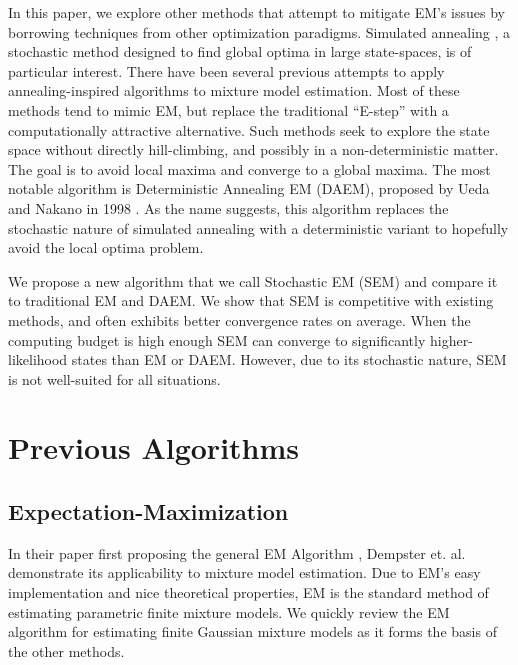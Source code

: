 \documentclass{article}
\theoremstyle{definition}
\theoremstyle{algodesc}
\begin{document}
In this paper, we explore other methods that attempt to mitigate EM's issues by borrowing techniques from other optimization paradigms. Simulated annealing \cite{kirkpatrickgelattvecchi83}, a stochastic method designed to find global optima in large state-spaces, is of particular interest. There have been several previous attempts to apply annealing-inspired algorithms to mixture model estimation. Most of these methods tend to mimic EM, but replace the traditional ``E-step'' with a computationally attractive alternative. Such methods seek to explore the state space without directly hill-climbing, and possibly in a non-deterministic matter. The goal is to avoid local maxima and converge to a global maxima. The most notable algorithm is Deterministic Annealing EM (DAEM), proposed by Ueda and Nakano in 1998 \cite{uedanakano98}. As the name suggests, this algorithm replaces the stochastic nature of simulated annealing with a deterministic variant to hopefully avoid the local optima problem.

We propose a new algorithm that we call Stochastic EM (SEM) and compare it to traditional EM and DAEM. We show that SEM is competitive with existing methods, and often exhibits better convergence rates on average. When the computing budget is high enough SEM can converge to significantly higher-likelihood states than EM or DAEM. However, due to its stochastic nature, SEM is not well-suited for all situations.


\section{Previous Algorithms} \label{sec:prev_algos}


\subsection{Expectation-Maximization}

In their paper first proposing the general EM Algorithm \cite{dempsterlairdrubin77}, Dempster et. al. demonstrate its applicability to mixture model estimation. Due to EM's easy implementation and nice theoretical properties, EM is the standard method of estimating parametric finite mixture models. We quickly review the EM algorithm for estimating finite Gaussian mixture models as it forms the basis of the other methods.
\end{document}
